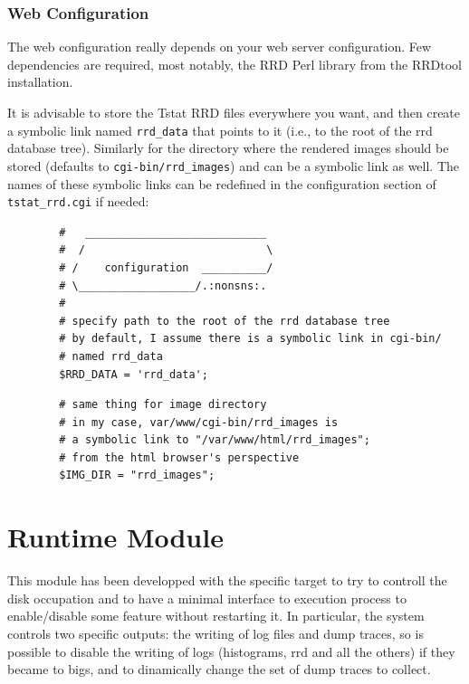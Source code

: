 \documentclass[11pt]{article}
\begin{document}
\subsubsection{Web Configuration\label{Web_Configuration}}


The web configuration really depends on your web server configuration. Few
dependencies are required, most notably, the RRD Perl library from the RRDtool
installation.



It is advisable to store the Tstat RRD files
everywhere you want, and then create a symbolic link 
named \texttt{rrd\_data} that points to it (i.e., to the root of 
the rrd database tree). Similarly for the directory
where the rendered images should be stored (defaults to \texttt{cgi-bin/rrd\_images})
and can be a symbolic link as well.
The names of these symbolic links can be redefined in the 
configuration section of \texttt{tstat\_rrd.cgi} if needed:

\begin{small}\begin{verbatim}
        #   ____________________________
        #  /                            \
        # /    configuration  __________/
        # \__________________/.:nonsns:.
        #
        # specify path to the root of the rrd database tree
        # by default, I assume there is a symbolic link in cgi-bin/
        # named rrd_data
        $RRD_DATA = 'rrd_data';
\end{verbatim}\end{small} \noindent
\begin{small}\begin{verbatim}
        # same thing for image directory
        # in my case, var/www/cgi-bin/rrd_images is
        # a symbolic link to "/var/www/html/rrd_images";
        # from the html browser's perspective
        $IMG_DIR = "rrd_images";
\end{verbatim}\end{small} \noindent
\section{Runtime Module\label{Runtime_Module}}


This module has been developped with the specific target to try to controll the disk
occupation and to have a minimal interface
to execution process to enable/disable some feature without restarting it. 
In particular, the system controls two specific outputs: the writing of log files and dump traces, so
is possible to disable the writing of logs (histograms, rrd and all the others) if they
became to bigs, and to dinamically change the set of dump traces to collect.
\end{document}
